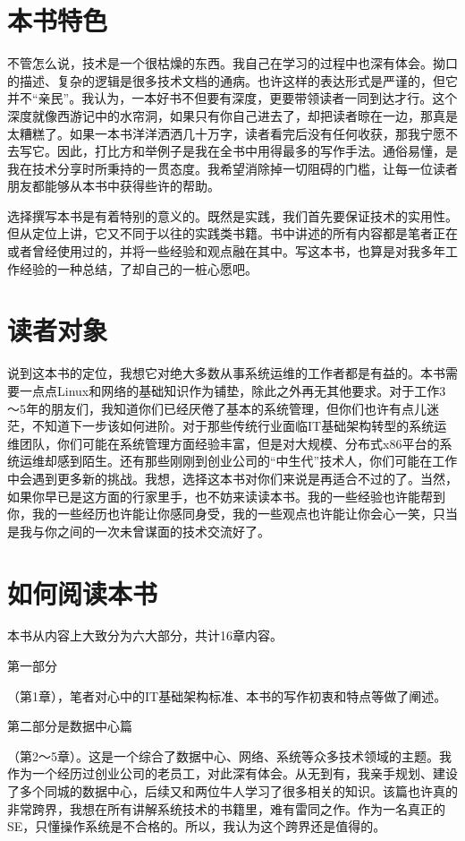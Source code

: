 \documentclass[12pt,UTF8]{ctexbook}
\begin{document}
\section{本书特色}

不管怎么说，技术是一个很枯燥的东西。我自己在学习的过程中也深有体会。拗口的描述、复杂的逻辑是很多技术文档的通病。也许这样的表达形式是严谨的，但它并不“亲民”。我认为，一本好书不但要有深度，更要带领读者一同到达才行。这个深度就像西游记中的水帘洞，如果只有你自己进去了，却把读者晾在一边，那真是太糟糕了。如果一本书洋洋洒洒几十万字，读者看完后没有任何收获，那我宁愿不去写它。因此，打比方和举例子是我在全书中用得最多的写作手法。通俗易懂，是我在技术分享时所秉持的一贯态度。我希望消除掉一切阻碍的门槛，让每一位读者朋友都能够从本书中获得些许的帮助。

选择撰写本书是有着特别的意义的。既然是实践，我们首先要保证技术的实用性。但从定位上讲，它又不同于以往的实践类书籍。书中讲述的所有内容都是笔者正在或者曾经使用过的，并将一些经验和观点融在其中。写这本书，也算是对我多年工作经验的一种总结，了却自己的一桩心愿吧。

\section{读者对象}

说到这本书的定位，我想它对绝大多数从事系统运维的工作者都是有益的。本书需要一点点Linux和网络的基础知识作为铺垫，除此之外再无其他要求。对于工作3～5年的朋友们，我知道你们已经厌倦了基本的系统管理，但你们也许有点儿迷茫，不知道下一步该如何进阶。对于那些传统行业面临IT基础架构转型的系统运维团队，你们可能在系统管理方面经验丰富，但是对大规模、分布式x86平台的系统运维却感到陌生。还有那些刚刚到创业公司的“中生代”技术人，你们可能在工作中会遇到更多新的挑战。我想，选择这本书对你们来说是再适合不过的了。当然，如果你早已是这方面的行家里手，也不妨来读读本书。我的一些经验也许能帮到你，我的一些经历也许能让你感同身受，我的一些观点也许能让你会心一笑，只当是我与你之间的一次未曾谋面的技术交流好了。

\section{如何阅读本书}

本书从内容上大致分为六大部分，共计16章内容。

第一部分

（第1章），笔者对心中的IT基础架构标准、本书的写作初衷和特点等做了阐述。

第二部分是数据中心篇

（第2～5章）。这是一个综合了数据中心、网络、系统等众多技术领域的主题。我作为一个经历过创业公司的老员工，对此深有体会。从无到有，我亲手规划、建设了多个同城的数据中心，后续又和两位牛人学习了很多相关的知识。该篇也许真的非常跨界，我想在所有讲解系统技术的书籍里，难有雷同之作。作为一名真正的SE，只懂操作系统是不合格的。所以，我认为这个跨界还是值得的。
\end{document}
